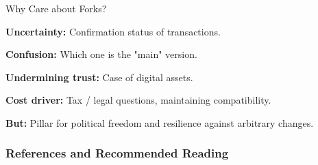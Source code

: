 \documentclass[handout]{beamer}
\begin{document}



\begin{frame}{Why Care about Forks?}

\textbf{Uncertainty:} Confirmation status of transactions.
\vspace{1.5em}

\textbf{Confusion:} Which one is the "main" version.
\vspace{1.5em}

\textbf{Undermining trust:} Case of digital assets.
\vspace{1.5em}

\textbf{Cost driver:} Tax / legal questions, maintaining compatibility.
\vspace{1.5em}

\color{focus} \textbf{But:} \color{black} Pillar for political freedom and resilience against arbitrary changes.

	
\end{frame}

\begin{frame}%
\frametitle{References and Recommended Reading}

	
	

\end{frame}
\end{document}
